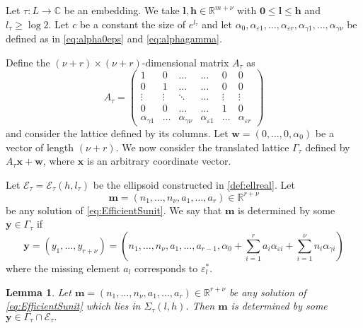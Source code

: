 \documentclass[11pt]{report}
\newtheorem{lemma}[theorem]{Lemma}
\theoremstyle{definition}
\begin{document}
Let $\tau:L\to\mathbb{C}$ be an embedding. We take $\mathbf{l},\mathbf{h} \in \mathbb{R}^{m+\nu}$ with $\mathbf{0}\leq \mathbf{l}\leq \mathbf{h}$ and $l_\tau\geq \log 2$. Let $c$ be a constant the size of $e^{l_\tau}$ and let $\alpha_0, \alpha_{\varepsilon 1}, \dots, \alpha_{\varepsilon {r}}, \alpha_{\gamma 1}, \dots, \alpha_{\gamma {\nu}}$ be defined as in \eqref{eq:alpha0eps} and \eqref{eq:alphagamma}.

Define the $(\nu+r) \times (\nu +r)$-dimensional matrix $A_{\tau}$ as
\[A_{\tau} = \begin{pmatrix}
	1 & 0 & \dots &  \dots & 0 & 0\\
	0 & 1	& \dots & \dots & 0 & 0\\
	\vdots & \vdots & \ddots & \dots & \vdots & \vdots \\
	0 & 0 & \dots &  \dots & 1 & 0\\
	\alpha_{\gamma 1} & \dots &\alpha_{\gamma {\nu}} & \alpha_{\varepsilon 1} & \dots & \alpha_{\varepsilon {r}}
\end{pmatrix}\]
and consider the lattice defined by its columns. Let $\mathbf{w} = (0,\dotsc,0,\alpha_0)$ be a vector of length $(\nu + r)$. We now consider the translated lattice $\Gamma_{\tau}$ defined by $A_{\tau}\mathbf{x} + \mathbf{w}$, where $\mathbf{x}$ is an arbitrary coordinate vector.

Let $\mathcal E_{\tau}=\mathcal E_{\tau}(h,l_{\tau})$ be the ellipsoid constructed in \eqref{def:ellreal}. Let
\[\mathbf{m} = (n_1, \dots, n_{\nu}, a_1, \dots, a_r) \in \mathbb{R}^{r + \nu}\]
be any solution of \eqref{eq:EfficientSunit}. We say that $\mathbf{m}$ is determined by some $\mathbf{y} \in \Gamma_{\tau}$ if
\[\mathbf{y} = (y_1, \dots, y_{r+ \nu}) = \left(n_1, \dots, n_{\nu}, a_1, \dots, a_{r-1}, \alpha_0+\sum_{i = 1}^r a_i \alpha_{\varepsilon i} + \sum_{i = 1}^{\nu} n_i \alpha_{\gamma i}\right)\]
where the missing element $a_{l}$ corresponds to $\varepsilon_l^*$.

\begin{lemma}\label{lem:archsieve}
Let ${\mathbf{m} = (n_1, \dots, n_{\nu}, a_1, \dots, a_r) \in \mathbb{R}^{r + \nu}}$ be any solution of \eqref{eq:EfficientSunit} which lies in $\Sigma_\tau(l,h)$. Then $\mathbf{m}$ is determined by some $\mathbf{y}\in \Gamma_\tau\cap\mathcal E_\tau.$
\end{lemma}
\end{document}
